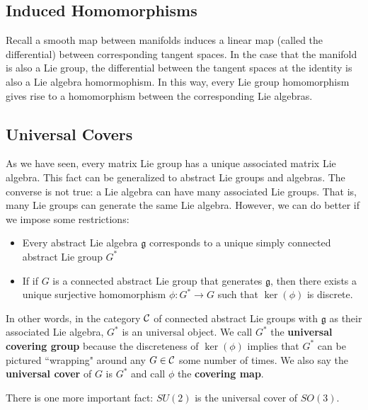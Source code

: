 \subsection{Induced Homomorphisms}
Recall a smooth map between manifolds induces a linear map (called the differential) between corresponding tangent spaces. In the case that the manifold is also a Lie group, the differential between the tangent spaces at the identity is also a Lie algebra homormophism. In this way, every Lie group homomorphism gives rise to a homomorphism between the corresponding Lie algebras.

\subsection{Universal Covers}
As we have seen, every matrix Lie group has a unique associated matrix Lie algebra. This fact can be generalized to abstract Lie groups and algebras. The converse is not true: a Lie algebra can have many associated Lie groups. That is, many Lie groups can generate the same Lie algebra. However, we can do better if we impose some restrictions:
\begin{itemize}
    \item Every abstract Lie algebra $\mathfrak g$ corresponds to a unique simply connected abstract Lie group $G^*$
    \item If if $G$ is a connected abstract Lie group that generates $\mathfrak g$, then there exists a unique surjective homomorphism $\phi: G^* \rightarrow G$ such that $\ker(\phi)$ is discrete.
\end{itemize}
In other words, in the category ${\mathcal C}$ of connected abstract Lie groups with $\mathfrak g$ as their associated Lie algebra, $G^*$ is an universal object. We call $G^*$ the \textbf{universal covering group} because the discreteness of $\ker(\phi)$ implies that $G^*$ can be pictured ``wrapping" around any $G \in {\mathcal C}$ some number of times. We also say the \textbf{universal cover} of $G$ is $G^*$ and call $\phi$ the \textbf{covering map}.

There is one more important fact: $SU(2)$ is the universal cover of $SO(3)$.
